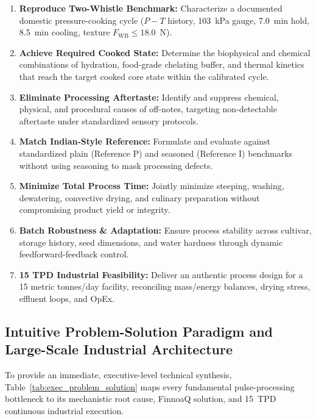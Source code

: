 \documentclass[10pt,a4paper]{article}
\begin{document}
\begin{enumerate}[label=\textbf{Objective \Alph*:},leftmargin=2.2cm]
    \item \textbf{Reproduce Two-Whistle Benchmark:} Characterize a documented domestic pressure-cooking cycle ($P-T$ history, 103~kPa gauge, 7.0~min hold, 8.5~min cooling, texture $F_{\mathrm{WB}} \le 18.0$~N).
    \item \textbf{Achieve Required Cooked State:} Determine the biophysical and chemical combinations of hydration, food-grade chelating buffer, and thermal kinetics that reach the target cooked core state within the calibrated cycle.
    \item \textbf{Eliminate Processing Aftertaste:} Identify and suppress chemical, physical, and procedural causes of off-notes, targeting non-detectable aftertaste under standardized sensory protocols.
    \item \textbf{Match Indian-Style Reference:} Formulate and evaluate against standardized plain (Reference P) and seasoned (Reference I) benchmarks without using seasoning to mask processing defects.
    \item \textbf{Minimize Total Process Time:} Jointly minimize steeping, washing, dewatering, convective drying, and culinary preparation without compromising product yield or integrity.
    \item \textbf{Batch Robustness \& Adaptation:} Ensure process stability across cultivar, storage history, seed dimensions, and water hardness through dynamic feedforward-feedback control.
    \item \textbf{15 TPD Industrial Feasibility:} Deliver an authentic process design for a 15 metric tonnes/day facility, reconciling mass/energy balances, drying stress, effluent loops, and OpEx.
\end{enumerate}

\subsection{Intuitive Problem-Solution Paradigm and Large-Scale Industrial Architecture}
To provide an immediate, executive-level technical synthesis, Table~\ref{tab:exec_problem_solution} maps every fundamental pulse-processing bottleneck to its mechanistic root cause, FinnoaQ solution, and 15~TPD continuous industrial execution.
\end{document}
